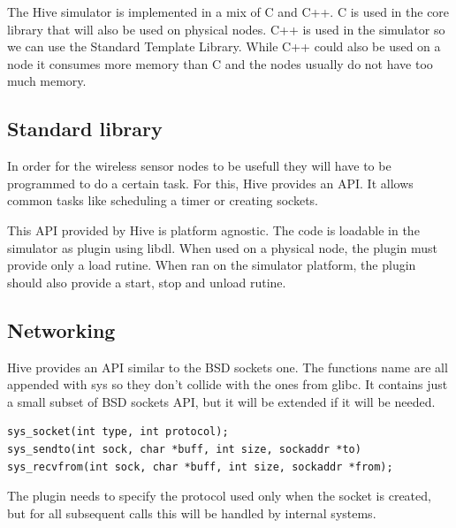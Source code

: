 
The Hive simulator is implemented in a mix of C and C++. C is used in the core
library that will also be used on physical nodes. C++ is used in the
simulator so we can use the Standard Template Library. While C++ could also be
used on a node it consumes more memory than C and the nodes usually do not
have too much memory.

\subsection{Standard library}

In order for the wireless sensor nodes to be usefull they will have to be
programmed to do a certain task. For this, Hive provides an API. It allows
common tasks like scheduling a timer or creating sockets. 

This API provided by Hive is platform agnostic. The code is loadable in the
simulator as plugin using libdl. When used on a physical node, the plugin must
provide only a load rutine. When ran on the simulator platform, the plugin
should also provide a start, stop and unload rutine.

\subsection{Networking}

Hive provides an API similar to the BSD sockets one. The functions name are
all appended with sys so they don't collide with the ones from glibc. It
contains just a small subset of BSD sockets API, but it will be extended if
it will be needed.
\begin{lstlisting}
sys_socket(int type, int protocol);
sys_sendto(int sock, char *buff, int size, sockaddr *to)
sys_recvfrom(int sock, char *buff, int size, sockaddr *from);
\end{lstlisting}
The plugin needs to specify the protocol used only when the socket is created,
but for all subsequent calls this will be handled by internal systems. 

